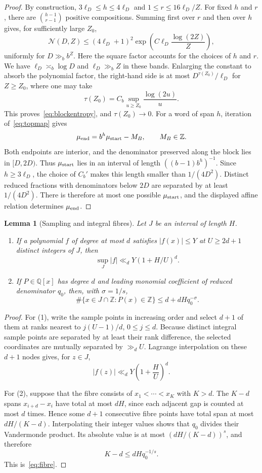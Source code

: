 \documentclass[a4paper,10pt]{amsart}
\newtheorem{lemma}[theorem]{Lemma}
\theoremstyle{remark}
\newcommand{\Q}{\mathbb Q}
\newcommand{\Z}{\mathbb Z}
\begin{document}
\begin{proof}
By construction, $3\ell_D\le h\le4\ell_D$ and
$1\le r\le16\ell_D/Z$. For fixed $h$ and $r$, there are
$\binom{h-1}{r-1}$ positive compositions. Summing first over $r$ and then over
$h$ gives, for sufficiently large $Z_0$,
\[
 \mathcal N(D,Z)
 \le (4\ell_D+1)^2
 \exp\!\left(C\ell_D\frac{\log(2Z)}Z\right),
\]
uniformly for $D\gg_b b^Z$. Here the square factor accounts for the choices of
$h$ and $r$. We have $\ell_D\asymp_b\log D$ and $\ell_D\gg_b Z$ in these
bands. Enlarging the constant to absorb the polynomial factor, the right-hand
side is at most $D^{\tau(Z_0)}/\ell_D$ for $Z\ge Z_0$, where one may take
\[
 \tau(Z_0)=C_b\sup_{u\ge Z_0}\frac{\log(2u)}u.
\]
This proves~\eqref{eq:blockentropy}, and $\tau(Z_0)\to0$.
For a word of span $h$, iteration of~\eqref{eq:topmap} gives
\[
 \mu_{\rm end}=b^h\mu_{\rm start}-M_B,\qquad M_B\in\Z.
\]
Both endpoints are interior, and the denominator preserved along the block
lies in $[D,2D)$. Thus $\mu_{\rm start}$ lies in an interval of length
$((b-1)b^h)^{-1}$. Since $h\ge3\ell_D$, the choice of $C_b'$ makes this length
smaller than $1/(4D^2)$. Distinct reduced fractions with denominators below
$2D$ are separated by at least $1/(4D^2)$. There is therefore at most one
possible $\mu_{\rm start}$, and the displayed affine relation determines
$\mu_{\rm end}$.
\end{proof}

\begin{lemma}[Sampling and integral fibres]\label{lem:sampling}
Let $J$ be an interval of length $H$.
\begin{enumerate}
\item If a polynomial $f$ of degree at most $d$ satisfies $|f(x)|\le Y$ at
$U\ge2d+1$ distinct integers of $J$, then
\[
 \sup_J|f|\ll_d Y(1+H/U)^d.
\]
\item If $P\in\Q[x]$ has degree $d$ and leading monomial coefficient of
reduced denominator $q_0$, then, with $\sigma=1/s$,
\begin{equation}\label{eq:fibre}
 \#\{x\in J\cap\Z:P(x)\in\Z\}\le d+dHq_0^{-\sigma}.
\end{equation}
\end{enumerate}
\end{lemma}

\begin{proof}
For (1), write the sample points in increasing order and select $d+1$ of them
at ranks nearest to $j(U-1)/d$, $0\le j\le d$. Because distinct integral
sample points are separated by at least their rank difference, the selected
coordinates are mutually separated by $\gg_d U$. Lagrange interpolation on
these $d+1$ nodes gives, for $z\in J$,
\[
 |f(z)|\ll_d Y\left(1+\frac HU\right)^d.
\]

For (2), suppose that the fibre consists of
$x_1<\cdots<x_K$ with $K>d$. The $K-d$ spans
$x_{i+d}-x_i$ have total at most $dH$, since each adjacent gap is counted at
most $d$ times. Hence some $d+1$ consecutive fibre points have total span at
most $dH/(K-d)$. Interpolating their integer values shows that $q_0$ divides
their Vandermonde product. Its absolute value is at most
$(dH/(K-d))^s$, and therefore
\[
 K-d\le dHq_0^{-1/s}.
\]
This is~\eqref{eq:fibre}.
\end{proof}
\end{document}
